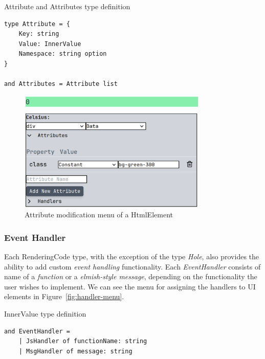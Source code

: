 \begin{listing}[htbp]
	\caption{Attribute and Attributes type definition}
	\label{fig:attrs-type}
	\begin{lstlisting}
type Attribute = {
    Key: string
    Value: InnerValue
    Namespace: string option
}

and Attributes = Attribute list
    \end{lstlisting}
\end{listing}

\begin{figure}[htbp]
	\begin{center}
		\includegraphics[width=0.8\textwidth]{img/attribute-menu.pdf}
	\end{center}
	\caption{Attribute modification menu of a HtmlElement}\label{fig:attrs-menu}
\end{figure}

\subsubsection{Event Handler}
Each RenderingCode type, with the exception of the type \emph{Hole}, also provides the ability to add custom \emph{event handling} functionality.
Each \emph{EventHandler} consists of name of a \emph{function} or a \emph{elmish-style message}, depending on the functionality the user wishes to implement.
We can see the menu for assigning the handlers to UI elements in Figure~\ref{fig:handler-menu}.

\begin{listing}[htbp]
	\caption{InnerValue type definition}
	\label{fig:handlers-type}
	\begin{lstlisting}
and EventHandler =
    | JsHandler of functionName: string
    | MsgHandler of message: string
  \end{lstlisting}
\end{listing}

